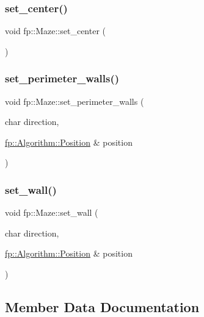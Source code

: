 \subsubsection{\texorpdfstring{set\+\_\+center()}{set\_center()}}
{\footnotesize\ttfamily void fp\+::\+Maze\+::set\+\_\+center (\begin{DoxyParamCaption}{ }\end{DoxyParamCaption})\hspace{0.3cm}{\ttfamily [static]}}

\mbox{\label{classfp_1_1_maze_aaed9b911fe0c4f3832c31fb2f409e756}} 
\subsubsection{\texorpdfstring{set\+\_\+perimeter\+\_\+walls()}{set\_perimeter\_walls()}}
{\footnotesize\ttfamily void fp\+::\+Maze\+::set\+\_\+perimeter\+\_\+walls (\begin{DoxyParamCaption}\item[{char}]{direction,  }\item[{\hyperlink{structfp_1_1_algorithm_1_1_position}{fp\+::\+Algorithm\+::\+Position} \&}]{position }\end{DoxyParamCaption})}

\mbox{\label{classfp_1_1_maze_a5f9ce00ecfc833c1a86a865bddaeb477}} 
\subsubsection{\texorpdfstring{set\+\_\+wall()}{set\_wall()}}
{\footnotesize\ttfamily void fp\+::\+Maze\+::set\+\_\+wall (\begin{DoxyParamCaption}\item[{char}]{direction,  }\item[{\hyperlink{structfp_1_1_algorithm_1_1_position}{fp\+::\+Algorithm\+::\+Position} \&}]{position }\end{DoxyParamCaption})}



\subsection{Member Data Documentation}
\mbox{\label{classfp_1_1_maze_a00c8f6ef7716d82c28e91b8cf29cbb68}} 
